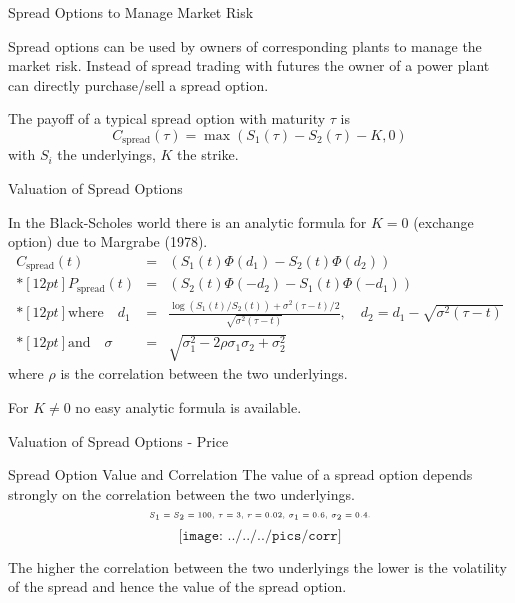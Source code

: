 
{Spread Options to Manage Market Risk}
\item<1-> Spread options can be used by owners of corresponding plants to
manage the market risk. Instead of spread trading with futures the owner of a power plant can directly purchase/sell a spread option.
\item<2->
The payoff of a typical spread option with maturity $\tau$ is
$$C_{\mbox{spread}}{(\tau)}=\max(S_1(\tau)-S_2(\tau)-K,0)$$ with $S_i$ the
underlyings, $K$ the strike.

{Valuation of Spread Options}

In the Black-Scholes world  there is an analytic formula for $K=0$ (exchange option) due to
Margrabe (1978).
$$\begin{array}{lll}
 C_{\mbox{spread}}(t) & = & (S_1(t)\Phi(d_1)-S_2(t)\Phi(d_2))
 \\*[12pt]
 P_{\mbox{spread}}(t) & = & (S_2(t)\Phi(-d_2)-S_1(t)\Phi(-d_1))
 \\*[12pt]
 \mbox{where}\quad d_1 & = & \frac{\log(S_1(t)/S_2(t))+\sigma^{2}(\tau-t)/2}{\sqrt{\sigma^{2}(\tau-t)}},\quad d_2=d_1-\sqrt{\sigma^{2}(\tau-t)}
 \\*[12pt]
 \mbox{and}\quad \sigma & = & \sqrt{\sigma_1^2-2\rho\sigma_1\sigma_2+\sigma_2^2}
\end{array}$$
where $\rho$ is the correlation between the two underlyings.

For $K\neq 0$ no easy analytic formula is available.

{Valuation of Spread Options - Price}

{Spread Option Value and Correlation}
The value of a spread option depends strongly on the correlation between the two underlyings.
$$\tiny\text{$S_1=S_2=100$, $\tau=3$, $r=0.02$, $\sigma_1=0.6$, $\sigma_2=0.4$.}$$
\vspace{-0.76cm}
$$\texttt{[image: ../../../pics/corr]}$$
\vspace{-1cm}
\item The higher the correlation between the two underlyings the lower is the volatility of the spread and hence the value of the spread option.


